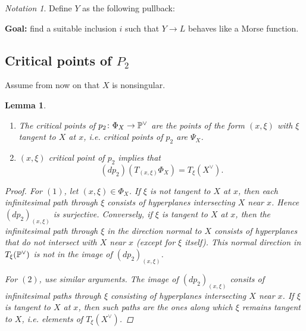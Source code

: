 \documentclass[A4paper, british, reqno]{amsart}
\theoremstyle{darkgreentheorem}
\newtheorem{lm}[thm]{Lemma}
\theoremstyle{darkbluedefinition}
\theoremstyle{darkredexample}
\theoremstyle{remark}
\newtheorem{nota}[thm]{Notation}
\newcommand{\1}{\mathbbm{1}}
\newcommand{\dual}{^{\vee}}
\begin{document}
\begin{nota}
    Define $Y$ as the following pullback:
    \begin{center}
    \end{center}
\end{nota}

\textbf{Goal:} find a suitable inclusion $i$ such that $Y\to L$ behaves like a Morse function.

\subsection{Critical points of $P_{2}$}

Assume from now on that $X$ is nonsingular.

\begin{lm}
    \begin{enumerate}
	\item The critical points of $p_{2}\colon \Phi_{X}\to \P\dual$ are the points of the form $(x,\xi)$ with $\xi$ tangent to $X$ at $x$, i.e. critical points of $p_{2}$ are $\Psi_{X}$.
	\item $(x,\xi)$ critical point of $p_{2}$ implies that
	    \[ (dp_{2})(T_{(x,\xi)}\Phi_{X})=T_{\xi}(X\dual). \]
    \end{enumerate}
    \begin{proof}
	For $(1)$, let $(x,\xi)\in \Phi_{X}$.
	If $\xi$ is not tangent to $X$ at $x$, then each infinitesimal path through $\xi$ consists of hyperplanes intersecting $X$ near $x$.
	Hence $(dp_{2})_{(x,\xi)}$ is surjective.
	Conversely, if $\xi$ is tangent to $X$ at $x$, then the infinitesimal path through $\xi$ in the direction normal to $X$ consists of hyperplanes that do not intersect with $X$ near $x$ (except for $\xi$ itself).
	This normal direction in $T_{\xi}(\P\dual)$ is not in the image of $(dp_{2})_{(x,\xi)}$.

	For $(2)$, use similar arguments.
	The image of $(dp_{2})_{(x,\xi)}$ consits of infinitesimal paths through $\xi$ consisting of hyperplanes intersecting $X$ near $x$.
	If $\xi$ is tangent to $X$ at $x$, then such paths are the ones along which $\xi$ remains tangent to $X$, i.e. elements of $T_{\xi}(X\dual)$.
    \end{proof}
\end{lm}
\end{document}
